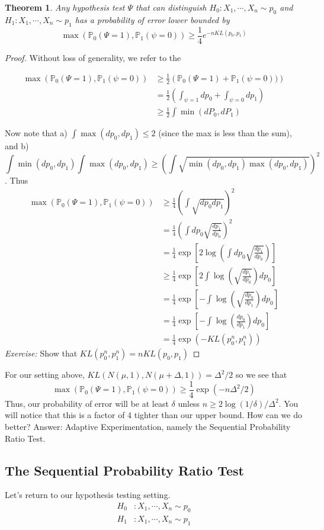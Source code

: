 \documentclass[11pt]{article}
\newtheorem{theorem}{Theorem}
\renewcommand{\P}{\mathbb{P}}
\newcommand{\1}{\mathbf{1}}
\begin{document}
\begin{theorem}
Any hypothesis test $\Psi$ that can distinguish $H_0: X_1,\cdots, X_n \sim p_0$ and $H_1: X_1,\cdots, X_n \sim p_1$ has a probability of error lower bounded by 
\[\max(\P_0(\Psi=1), \P_1(\psi=0))\geq \frac{1}{4}e^{-nKL(p_0, p_1)}\]
\end{theorem}
\begin{proof}
Without loss of generality, we refer to the 

\begin{align*}
\max(\P_0(\Psi=1), \P_1(\psi=0))
&\geq \frac{1}{2}\left(\P_0(\Psi=1) + \P_1(\psi=0))\right)\\
&= \frac{1}{2}\left(\int_{\psi=1} dp_0  + \int_{\psi=0} dp_1\right)\\
&\geq \frac{1}{2}\int \min(dP_0, dP_1)
\end{align*}

Now note that a) $\int \max(dp_0, dp_1) \leq 2$ (since the max is less than the sum), and b) \[\int \min(dp_0, dp_1)\int \max(dp_0, dp_1)\geq (\int \sqrt{ \min(dp_0, dp_1) \max(dp_0, dp_1)})^2\]. Thus
\begin{align*}
    \max(\P_0(\Psi=1), \P_1(\psi=0)) 
    &\geq \frac{1}{4} (\int \sqrt{dp_0 dp_1})^2\\
    &= \frac{1}{4} (\int dp_0\sqrt{ \frac{dp_1}{dp_0}})^2\\
    &= \frac{1}{4} \exp[2\log\left(\int dp_0\sqrt{ \frac{dp_1}{dp_0}}\right)]\\
    &\geq \frac{1}{4} \exp[2\int\log(\sqrt{ \frac{dp_1}{dp_0}})dp_0] \tag{Jensen's inequality}\\
    &= \frac{1}{4} \exp[-\int\log(\sqrt{ \frac{dp_0}{dp_1}})dp_0]\\
    &= \frac{1}{4} \exp[-\int\log(\frac{dp_0}{dp_1})dp_0]\\
    &= \frac{1}{4} \exp(-KL(p^n_0, p^n_1))
\end{align*}
\textit{Exercise:} Show that $KL(p^n_0, p^n_1) = nKL(p_0, p_1)$
\end{proof}

For our setting above, $KL(N(\mu, 1), N(\mu+\Delta,1)) = \Delta^2/2$ so we see that 
\[\max(\P_0(\Psi=1), \P_1(\psi=0)) \geq \frac{1}{4} \exp(-n\Delta^2/2)\]
Thus, our probability of error will be at least $\delta$ unless $n \geq 2\log(1/\delta)/\Delta^2$. You will notice that this is a factor of 4 tighter than our upper bound. How can we do better? Answer: Adaptive Experimentation, namely the Sequential Probability Ratio Test. 


\subsection{The Sequential Probability Ratio Test}
Let's return to our hypothesis testing setting. 
\begin{align*}
    H_0&: X_1,\cdots, X_n \sim p_0\\
    H_1&: X_1,\cdots, X_n \sim p_1
\end{align*}
\end{document}
